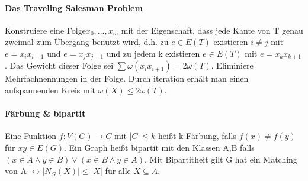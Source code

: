 \documentclass[10pt,landscape]{article}
\begin{document}
\begin{multicols}{3}
\paragraph{Das Traveling Salesman Problem}
Konstruiere eine Folge$x_0,...,x_m$ mit der Eigenschaft, dass jede Kante von T genau zweimal zum Übergang benutzt wird, d.h. zu $e\in E(T)$ existieren $i\not = j$ mit $e=x_i x_{i+1}$ und $e=x_j x_{j+1}$ und zu jedem k existieren $e\in E(T)$ mit $e=x_k x_{k+1}$. Das Gewicht dieser Folge sei $\sum \omega(x_i x_{i+1})= 2\omega(T)$.
Eliminiere Mehrfachnennungen in der Folge. Durch iteration erhält man einen aufspannenden Kreis mit $\omega(X) \leq 2 \omega(T)$.

\paragraph{Färbung \& bipartit}
Eine Funktion $f:V(G)\rightarrow C$ mit $|C|\leq k$ heißt k-Färbung, falls $f(x)\not = f(y)$ für $xy\in E(G)$.
Ein Graph heißt bipartit mit den Klassen A,B falls $(x\in A \wedge y\in B)\vee (x\in B \wedge y\in A)$. Mit Bipartitheit gilt G hat ein Matching von A $\leftrightarrow |N_G(X)|\leq |X|$ für alle $X\subseteq A$.

\end{multicols}
\end{document}
